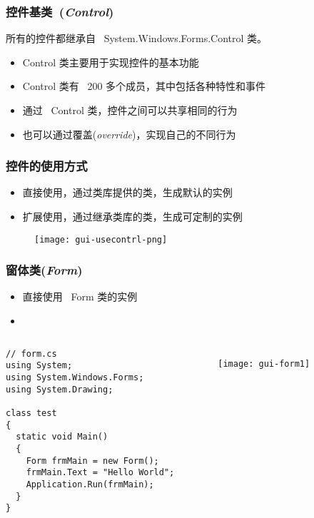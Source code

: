 \begin{frame}[fragile]
\frametitle{控件基类~(\textit{Control})}
所有的控件都继承自 ~System.Windows.Forms.Control 类。
\begin{itemize}
\item Control 类主要用于实现控件的基本功能
\item Control 类有 ~200 多个成员，其中包括各种特性和事件
\item 通过 ~Control 类，控件之间可以共享相同的行为
\item 也可以通过{\redwarn 覆盖}(\textit{override})，实现自己的不同行为
\end{itemize}
\begin{figure}[htbp]
  \centering
  
\end{figure}
\end{frame}

\begin{frame}[fragile]
\frametitle{控件的使用方式}
\begin{itemize}
\item 直接使用，通过类库提供的类，生成默认的实例
\item 扩展使用，通过继承类库的类，生成可定制的实例
\end{itemize}
\begin{figure}[htbp]
  \centering
  \texttt{[image: gui-usecontrl-png]}
\end{figure}
\end{frame}

\begin{frame}[fragile]
\frametitle{窗体类(\textit{Form})}
\begin{itemize}
\item 直接使用 ~Form 类的实例
\item {}
\end{itemize}
\begin{columns}[t]
\begin{lstlisting}
// form.cs
using System;
using System.Windows.Forms;
using System.Drawing;

class test
{
  static void Main()
  {
    Form frmMain = new Form();
    frmMain.Text = "Hello World";
    Application.Run(frmMain);
  }
}
\end{lstlisting}
\begin{figure}[htbp]
  \centering
  \texttt{[image: gui-form1]}
\end{figure}
\end{columns}
\end{frame}

